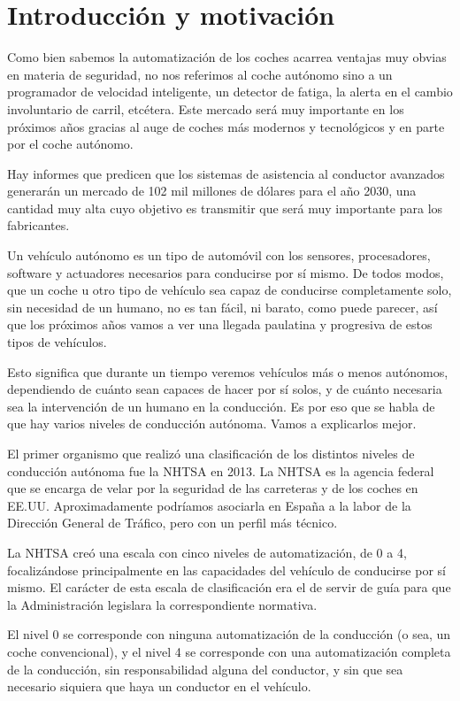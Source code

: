 \documentclass{pclass}
\begin{document}
\section{Introducción y motivación}

Como bien sabemos la automatización de los coches acarrea ventajas muy obvias en materia de seguridad, no nos referimos al coche autónomo sino a un programador de velocidad inteligente, un detector de fatiga, la alerta en el cambio involuntario de carril, etcétera. Este mercado será muy importante en los próximos años gracias al auge de coches más modernos y tecnológicos y en parte por el coche autónomo.

Hay informes que predicen que los sistemas de asistencia al conductor avanzados generarán un mercado de 102 mil millones de dólares para el año 2030, una cantidad muy alta cuyo objetivo es transmitir que será muy importante para los fabricantes. 

Un vehículo autónomo es un tipo de automóvil con los sensores, procesadores, software y actuadores necesarios para conducirse por sí mismo. De todos modos, que un coche u otro tipo de vehículo sea capaz de conducirse completamente solo, sin necesidad de un humano, no es tan fácil, ni barato, como puede parecer, así que los próximos años vamos a ver una llegada paulatina y progresiva de estos tipos de vehículos.

Esto significa que durante un tiempo veremos vehículos más o menos autónomos, dependiendo de cuánto sean capaces de hacer por sí solos, y de cuánto necesaria sea la intervención de un humano en la conducción. Es por eso que se habla de que hay varios niveles de conducción autónoma. Vamos a explicarlos mejor.

El primer organismo que realizó una clasificación de los distintos niveles de conducción autónoma fue la NHTSA en 2013. La NHTSA es la agencia federal que se encarga de velar por la seguridad de las carreteras y de los coches en EE.UU. Aproximadamente podríamos asociarla en España a la labor de la Dirección General de Tráfico, pero con un perfil más técnico.

La NHTSA creó una escala con cinco niveles de automatización, de 0 a 4, focalizándose principalmente en las capacidades del vehículo de conducirse por sí mismo. El carácter de esta escala de clasificación era el de servir de guía para que la Administración legislara la correspondiente normativa.

El nivel 0 se corresponde con ninguna automatización de la conducción (o sea, un coche convencional), y el nivel 4 se corresponde con una automatización completa de la conducción, sin responsabilidad alguna del conductor, y sin que sea necesario siquiera que haya un conductor en el vehículo.
\end{document}
